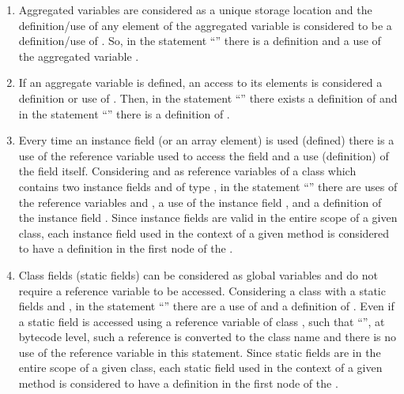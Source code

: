 \begin{enumerate}
    \item Aggregated variables are considered as a unique
    storage location and the definition/use of any element of
    the aggregated variable  is considered to be a
    definition/use of . So, in the statement
    ``'' there is a definition and a use of
    the aggregated variable .

    \item If an aggregate variable  is defined, an access to
    its elements is considered a definition or use of . Then,
    in the statement ``'' there exists a definition
    of  and in the statement ``'' there is a definition of .

    \item Every time an instance field (or an array element)
    is used (defined) there is a use of the reference variable used to access the field
    and a use (definition) of the field itself. Considering
     and  as reference variables of a class
     which contains two instance fields  and  of
    type , in the statement ``''
    there are uses of the reference variables  and ,
    a use of the instance field , and a definition of the
    instance field . Since instance fields are valid in
    the entire scope of a given class, each instance field
    used in the context of a given method is considered
    to have a definition in the first node of the \IG.

    \item Class fields (static fields) can be considered as global variables
     and do not require a reference variable to be
     accessed. Considering a class  with
     a static fields  and , in the statement
     ``'' there are a use of  and a definition of
     . Even if a static field is accessed using a
     reference variable  of class , such that
     ``'', at bytecode level, such a reference is
     converted to the class name and there is no use of the
     reference variable in this statement. Since
     static fields are in the entire scope of a given class,
     each static field used in the context of a given method is
     considered to have a definition in the first node of the \IG.


\end{enumerate}
